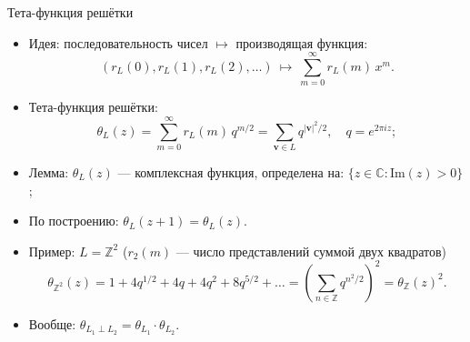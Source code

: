 \documentclass[serif, aspectratio=169]{beamer}
\begin{document}
\begin{frame}{Тета-функция решётки}
    \begin{itemize}
        \item Идея: последовательность чисел $\mapsto$ производящая функция:
        \[(r_L(0), r_L(1), r_L(2), \dots) \ \mapsto\ \sum_{m=0}^\infty r_L(m)\,x^m.\]
        \item Тета-функция решётки:
        \[\theta_L(z) = \sum_{m=0}^\infty r_L(m)\,q^{m/2} = \sum_{\mathbf{v}\in L} q^{|\mathbf{v}|^2/2},\quad q = e^{2\pi i z};\]
        \item Лемма: $\theta_L(z)$ --- комплексная функция, определена на: $\{z \in \mathbb{C} : \mathrm{Im}(z) > 0\}$;
        \item По построению: $\theta_L(z+1)=\theta_L(z)$.
        \item Пример: $L=\mathbb{Z}^2$ ($r_2(m)$ --- число представлений суммой двух квадратов)
        \[\theta_{\mathbb{Z}^2}(z) = 1 + 4q^{1/2} + 4q + 4q^2 + 8q^{5/2} + \dots = \left(\sum_{n\in\mathbb{Z}} q^{n^2/2}\right)^{\!2} = \theta_{\mathbb{Z}}(z)^2.\]
        \item Вообще: $\theta_{L_1\perp L_2}=\theta_{L_1}\cdot\theta_{L_2}$.
    \end{itemize}
    \note{
        \begin{itemize}
            \item ---
        \end{itemize}
    }
\end{frame}
\end{document}
